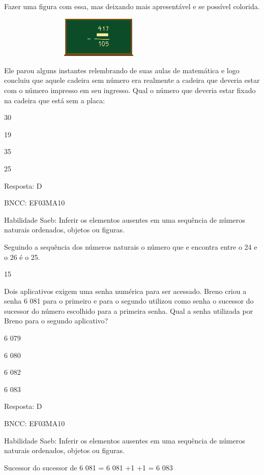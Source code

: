 \begin{escolha}
{\begin{escolha}
{Fazer uma figura com essa, mas deixando mais apresentável e se possível
colorida.

\includegraphics[width=3.87534in,height=0.76673in]{media/image122.png}

Ele parou alguns instantes relembrando de suas aulas de matemática e
logo concluiu que aquele cadeira sem número era realmente a cadeira que
deveria estar com o número impresso em seu ingresso. Qual o número que
deveria estar fixado na cadeira que está sem a placa:

\begin{escolha}
\item
  30
\item
  19
\item
  35
\item
  25
\end{escolha}

Resposta: D

BNCC: EF03MA10

Habilidade Saeb: Inferir os elementos ausentes em uma sequência de
números naturais ordenados, objetos ou figuras.

Seguindo a sequência dos números naturais o número que e encontra entre
o 24 e o 26 é o 25.

\num{15}

Dois aplicativos exigem uma senha numérica para ser acessado. Breno
criou a senha 6 081 para o primeiro e para o segundo utilizou como senha
o sucessor do sucessor do número escolhido para a primeira senha. Qual a
senha utilizada por Breno para o segundo aplicativo?

\begin{escolha}
\item
  6 079
\item
  6 080
\item
  6 082
\item
  6 083
\end{escolha}

Resposta: D

BNCC: EF03MA10

Habilidade Saeb: Inferir os elementos ausentes em uma sequência de
números naturais ordenados, objetos ou figuras.

Sucessor do sucessor de 6 081 = 6 081 +1 +1 = 6 083

}
\end{escolha}}
\end{escolha}
